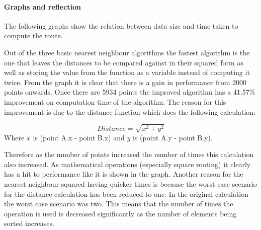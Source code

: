 \documentclass[conference,backref=page]{acmsiggraph}
\begin{document}
\paragraph{Graphs and reflection} \hfill

The following graphs show the relation between data size and time taken to compute the route.


Out of the three basic nearest neighbour algorithms the fastest algorithm is the one that leaves the distances to be compared against in their squared form as well as storing the value from the function as a variable instead of computing it twice. From the graph it is clear that there is a gain in performance from 2000 points onwards. Once there are 5934 points the improved algorithm has a 41.57\% improvement on computation time of the algorithm. The reason for this improvement is due to the distance function which does the following calculation:

\begin{equation}
Distance = \sqrt{x^2 + y^2}
\end{equation}
Where $x$ is (point A.x - point B.x) and $y$ is (point A.y - point B.y).

Therefore as the number of points increased the number of times this calculation also increased. As mathematical operations (especially square rooting) it clearly has a hit to performance like it is shown in the graph. Another reason for the nearest neighbour squared having quicker times is because the worst case scenario for the distance calculation has been reduced to one. In the original calculation the worst case scenario was two. This means that the number of times the operation is used is decreased significantly as the number of elements being sorted increases.
\end{document}
